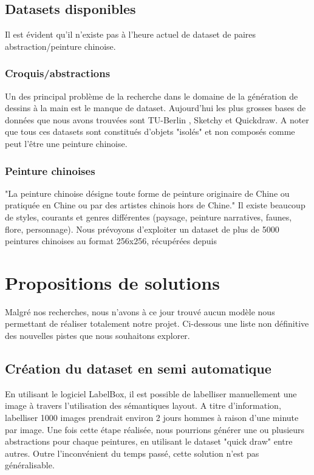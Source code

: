 \documentclass[a4paper, 12pt]{report}
\begin{document}
\section{Datasets disponibles}
Il est évident qu'il n'existe pas à l'heure actuel de dataset de paires abstraction/peinture chinoise.

\subsection{Croquis/abstractions}
Un des principal problème de la recherche dans le domaine de la génération de dessins à la main est le manque de dataset. Aujourd'hui les plus grosses bases de données que nous avons trouvées sont TU-Berlin \cite{eitz2012hdhso}, Sketchy \cite{sketchy2016} et Quickdraw. A noter que tous ces datasets sont constitués d'objets "isolés" et non composés comme peut l'être une peinture chinoise.

\subsection{Peinture chinoises}
"La peinture chinoise désigne toute forme de peinture originaire de Chine ou pratiquée en Chine ou par des artistes chinois hors de Chine." \cite{wiki:Peinture-chinoise} Il existe beaucoup de styles, courants et genres différentes (paysage, peinture narratives, faunes, flore, personnage). Nous prévoyons d'exploiter un dataset de plus de 5000 peintures chinoises au format 256x256, récupérées depuis \cite{ychen93}


\chapter{Propositions de solutions}

Malgré nos recherches, nous n'avons à ce jour trouvé aucun modèle nous permettant de réaliser totalement notre projet. Ci-dessous une liste non définitive des nouvelles pistes que nous souhaitons explorer.

\section{Création du dataset en semi automatique}

En utilisant le logiciel LabelBox, il est possible de labelliser manuellement une image à travers l'utilisation des sémantiques layout. A titre d'information, labelliser 1000 images prendrait environ 2 jours hommes à raison d'une minute par image. Une fois cette étape réalisée, nous pourrions générer une ou plusieurs abstractions pour chaque peintures, en utilisant le dataset "quick draw" entre autres. Outre l'inconvénient du temps passé, cette solution n'est pas généralisable.
\end{document}
